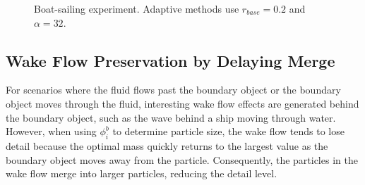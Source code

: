 \documentclass[VANCOUVER,STIX1COL]{WileyNJD-v2}
\begin{document}
\begin{figure}[htpb]
    \centering
    \vspace{-0.7\baselineskip}
    \caption{Boat-sailing experiment. Adaptive methods use $r_{base} = 0.2$ and $\alpha = 32$.}
    \label{fig:ship}
\end{figure}

\subsection{Wake Flow Preservation by Delaying Merge}
\label{sec:wake_flow}

For scenarios where the fluid flows past the boundary object or the boundary object moves through the fluid, interesting wake flow effects are generated behind the boundary object, such as the wave behind a ship moving through water. However, when using $\phi_i^b$ to determine particle size, the wake flow tends to lose detail because the optimal mass quickly returns to the largest value as the boundary object moves away from the particle. Consequently, the particles in the wake flow merge into larger particles, reducing the detail level.
\end{document}
